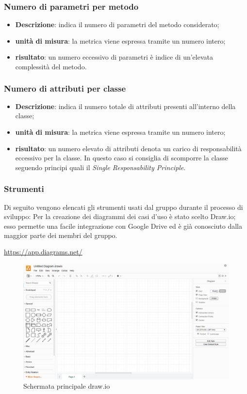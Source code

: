 	\subsubsection*{Numero di parametri per metodo}
	\begin{itemize}
		\item{\textbf{Descrizione}}: indica il numero di parametri del metodo considerato;
		\item{\textbf{unità di misura}}: la metrica viene espressa tramite un numero intero;
		\item{\textbf{risultato}}: un numero eccessivo di parametri è indice di un'elevata complessità del metodo.
	\end{itemize}

	\subsubsection*{Numero di attributi per classe}
	\begin{itemize}
		\item{\textbf{Descrizione}}: indica il numero totale di attributi presenti all'interno della classe;
		\item{\textbf{unità di misura}}: la metrica viene espressa tramite un numero intero;
		\item{\textbf{risultato}}: un numero elevato di attributi denota un carico di responsabilità eccessivo per la classe. In questo caso si consiglia di scomporre la classe seguendo principi quali il \textit{Single Responsability Principle}.
	\end{itemize}

\subsubsection{Strumenti}
	Di seguito vengono elencati gli strumenti usati dal gruppo durante il processo di sviluppo:
	Per la creazione dei diagrammi dei casi d'uso è stato scelto Draw.io; esso permette  una facile integrazione con Google Drive ed è già conosciuto dalla maggior parte dei membri del gruppo.
	\begin{center}
		\url{https://app.diagrams.net/}
	\end{center}
	\begin{figure}[h!]
		\centering
		\includegraphics[scale=0.62]{./res/img/draw.png}
		\caption{Schermata principale draw.io}
	\end{figure}

